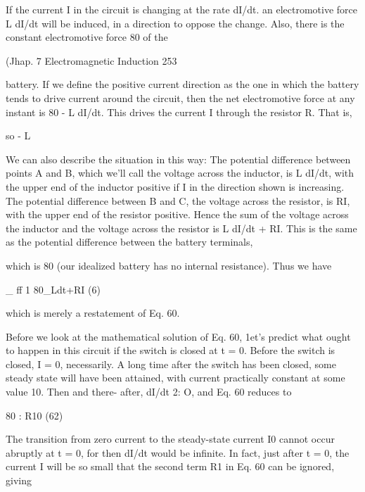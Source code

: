 If the current I in the circuit is changing at the rate dI/dt. an electromotive
force L dI/dt will be induced, in a direction to oppose the
change. Also, there is the constant electromotive force 80 of the

(Jhap. 7 Electromagnetic Induction 253

battery. If we define the positive current direction as the one in
which the battery tends to drive current around the circuit, then the
net electromotive force at any instant is 80 - L dI/dt. This drives
the current I through the resistor R. That is,

\begin{equation}
\end{equation}
so - L%

We can also describe the situation in this way: The potential difference
between points A and B, which we'll call the voltage across
the inductor, is L dI/dt, with the upper end of the inductor positive
if I in the direction shown is increasing. The potential difference
between B and C, the voltage across the resistor, is RI, with the upper
end of the resistor positive. Hence the sum of the voltage across the
inductor and the voltage across the resistor is L dI/dt + RI. This is
the same as the potential difference between the battery terminals,

which is 80 (our idealized battery has no internal resistance). Thus
we have

\begin{equation}
\end{equation}
_ ff 1
80_Ldt+RI (6)

which is merely a restatement of Eq. 60.

Before we look at the mathematical solution of Eq. 60, 1et's predict
what ought to happen in this circuit if the switch is closed at t = 0.
Before the switch is closed, I = 0, necessarily. A long time after the
switch has been closed, some steady state will have been attained,
with current practically constant at some value 10. Then and there-
after, dI/dt 2: O, and Eq. 60 reduces to

\begin{equation}
\end{equation}
80 : R10 (62)

The transition from zero current to the steady-state current I0 cannot
occur abruptly at t = 0, for then dI/dt would be infinite. In fact,
just after t = 0, the current I will be so small that the second term
R1 in Eq. 60 can be ignored, giving

